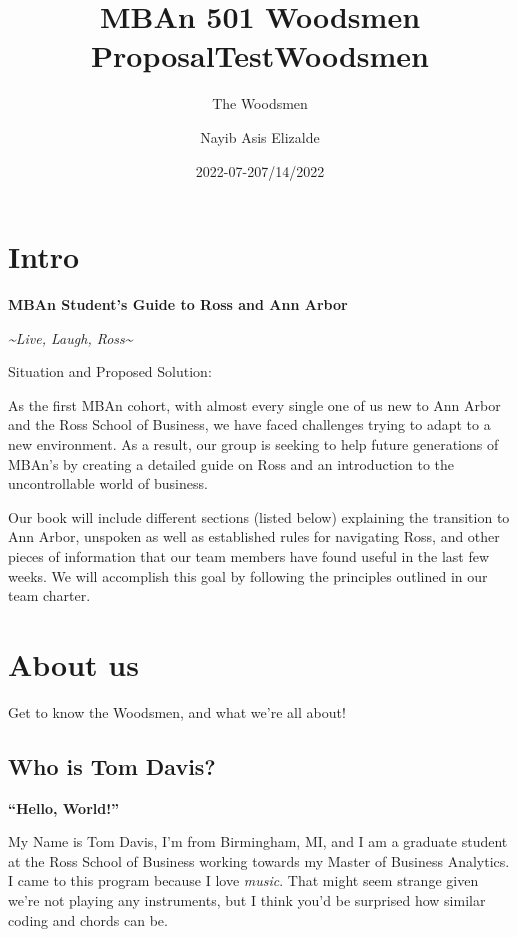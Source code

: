 \documentclass[
]{book}
\title{MBAn 501 Woodsmen Proposal}
\author{The Woodsmen}
\date{2022-07-20}
\title{TestWoodsmen}
\author{Nayib Asis Elizalde}
\date{7/14/2022}
\begin{document}
\maketitle

{
\setcounter{tocdepth}{1}
\tableofcontents
}
\hypertarget{intro}{%
\chapter{Intro}\label{intro}}

\textbf{MBAn Student's Guide to Ross and Ann Arbor}

\emph{\textasciitilde Live, Laugh, Ross\textasciitilde{}}

Situation and Proposed Solution:

As the first MBAn cohort, with almost every single one of us new to Ann Arbor and the Ross School of Business, we have faced challenges trying to adapt to a new environment. As a result, our group is seeking to help future generations of MBAn's by creating a detailed guide on Ross and an introduction to the uncontrollable world of business.

Our book will include different sections (listed below) explaining the transition to Ann Arbor, unspoken as well as established rules for navigating Ross, and other pieces of information that our team members have found useful in the last few weeks. We will accomplish this goal by following the principles outlined in our team charter.

\hypertarget{about-us}{%
\chapter{About us}\label{about-us}}

Get to know the Woodsmen, and what we're all about!

\hypertarget{who-is-tom-davis}{%
\section{Who is Tom Davis?}\label{who-is-tom-davis}}

\textbf{``Hello, World!''}

My Name is Tom Davis, I'm from Birmingham, MI, and I am a graduate student at the Ross School of Business working towards my Master of Business Analytics. I came to this program because I love \emph{music}. That might seem strange given we're not playing any instruments, but I think you'd be surprised how similar coding and chords can be.
\end{document}
